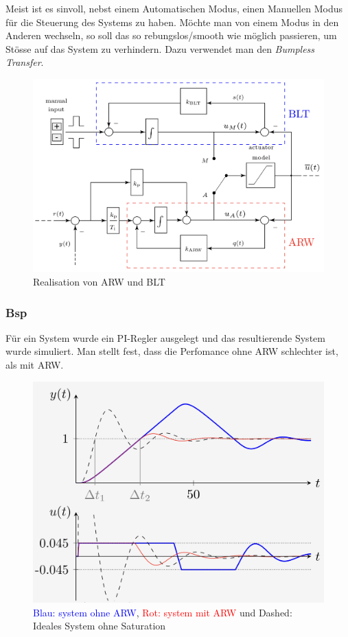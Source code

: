         Meist ist es sinvoll, nebst einem Automatischen Modus, einen Manuellen Modus für die Steuerung des Systems zu haben. Möchte man von einem Modus in den Anderen wechseln, so soll das so rebungslos/smooth wie möglich passieren, um Stösse auf das System zu verhindern. Dazu verwendet man den \textit{Bumpless Transfer}.
        
        \begin{figure}[H]
            \centering
            \includegraphics[width = 0.6\linewidth]{images/04/arw_bt.jpeg}
            \caption{Realisation von ARW und BLT}
        \end{figure}
        
    \subsubsection{Bsp}
        Für ein System wurde ein PI-Regler ausgelegt und das resultierende System wurde simuliert. Man stellt fest, dass die Perfomance ohne ARW schlechter ist, als mit ARW.
        
        \begin{figure}[H]
            \centering
            \includegraphics[width = 0.6\linewidth]{images/04/arw_bsp.jpeg}
            \caption{\textcolor{blue}{Blau: system ohne ARW}, \textcolor{red}{Rot: system mit ARW} und Dashed: Ideales System ohne Saturation}
        \end{figure}